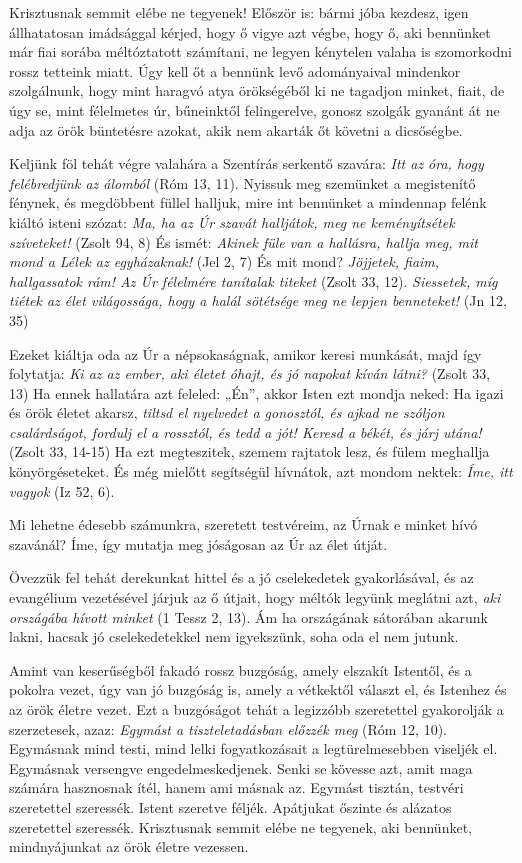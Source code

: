 \documentclass[twoside]{article}
\begin{document}
\begin{lectio}{Krisztusnak semmit elébe ne tegyenek!}
\noindent Először is: bármi jóba kezdesz, igen állhatatosan imádsággal kérjed, hogy ő vigye azt végbe, hogy ő, aki bennünket már fiai sorába méltóztatott számítani, ne legyen kénytelen valaha is szomorkodni rossz tetteink miatt. Úgy kell őt a bennünk levő adományaival mindenkor szolgálnunk, hogy mint haragvó atya örökségéből ki ne tagadjon minket, fiait, de úgy se, mint félelmetes úr, bűneinktől felingerelve, gonosz szolgák gyanánt át ne adja az örök büntetésre azokat, akik nem akarták őt követni a dicsőségbe.

Keljünk föl tehát végre valahára a Szentírás serkentő szavára: \textit{Itt az óra, hogy felébredjünk az álomból} (Róm 13, 11). Nyissuk meg szemünket a megistenítő fénynek, és megdöbbent füllel halljuk, mire int bennünket a mindennap felénk kiáltó isteni szózat: \textit{Ma, ha az Úr szavát halljátok, meg ne keményítsétek szíveteket!} (Zsolt 94, 8) És ismét: \textit{Akinek füle van a hallásra, hallja meg, mit mond a Lélek az egyházaknak!} (Jel 2, 7) És mit mond? \textit{Jöjjetek, fiaim, hallgassatok rám! Az Úr félelmére tanítalak titeket} (Zsolt 33, 12). \textit{Siessetek, míg tiétek az élet világossága, hogy a halál sötétsége meg ne lepjen benneteket!} (Jn 12, 35)

Ezeket kiáltja oda az Úr a népsokaságnak, amikor keresi munkását, majd így folytatja: \textit{Ki az az ember, aki életet óhajt, és jó napokat kíván látni?} (Zsolt 33, 13) Ha ennek hallatára azt feleled: „Én”, akkor Isten ezt mondja neked: Ha igazi és örök életet akarsz, \textit{tiltsd el nyelvedet a gonosztól, és ajkad ne szóljon csalárdságot, fordulj el a rossztól, és tedd a jót! Keresd a békét, és járj utána!} (Zsolt 33, 14-15) Ha ezt megteszitek, szemem rajtatok lesz, és fülem meghallja könyörgéseteket. És még mielőtt segítségül hívnátok, azt mondom nektek: \textit{Íme, itt vagyok} (Iz 52, 6).

Mi lehetne édesebb számunkra, szeretett testvéreim, az Úrnak e minket hívó szavánál? Íme, így mutatja meg jóságosan az Úr az élet útját.

Övezzük fel tehát derekunkat hittel és a jó cselekedetek gyakorlásával, és az evangélium vezetésével járjuk az ő útjait, hogy méltók legyünk meglátni azt, \textit{aki országába hívott minket} (1 Tessz 2, 13). Ám ha országának sátorában akarunk lakni, hacsak jó cselekedetekkel nem igyekszünk, soha oda el nem jutunk.

Amint van keserűségből fakadó rossz buzgóság, amely elszakít Istentől, és a pokolra vezet, úgy van jó buzgóság is, amely a vétkektől választ el, és Istenhez és az örök életre vezet. Ezt a buzgóságot tehát a legizzóbb szeretettel gyakorolják a szerzetesek, azaz: \textit{Egymást a tiszteletadásban előzzék meg} (Róm 12, 10). Egymásnak mind testi, mind lelki fogyatkozásait a legtürelmesebben viseljék el. Egymásnak versengve engedelmeskedjenek. Senki se kövesse azt, amit maga számára hasznosnak ítél, hanem ami másnak az. Egymást tisztán, testvéri szeretettel szeressék. Istent szeretve féljék. Apátjukat őszinte és alázatos szeretettel szeressék. Krisztusnak semmit elébe ne tegyenek, aki bennünket, mindnyájunkat az örök életre vezessen.
\end{lectio}
\end{document}
